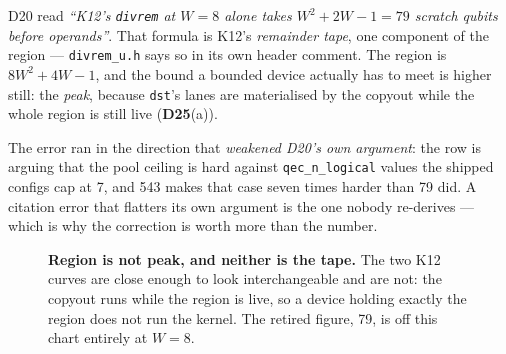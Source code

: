 D20 read \emph{``K12's \texttt{divrem} at $W=8$ alone takes $W^2+2W-1 = 79$
scratch qubits before operands''}. That formula is K12's \emph{remainder tape},
one component of the region --- \texttt{divrem\_u.h} says so in its own header
comment. The region is $8W^2+4W-1$, and the bound a bounded device actually has
to meet is higher still: the \emph{peak}, because \texttt{dst}'s lanes are
materialised by the copyout while the whole region is still live (\textbf{D25}(a)).

\begin{figures}
\end{figures}

\noindent The error ran in the direction that \emph{weakened D20's own
argument}: the row is arguing that the pool ceiling is hard against
\texttt{qec\_n\_logical} values the shipped configs cap at 7, and 543 makes that
case seven times harder than 79 did. A citation error that flatters its own
argument is the one nobody re-derives --- which is why the correction is worth
more than the number.

\begin{figure}[H]
\centering
{}
\caption*{\small\textbf{Region is not peak, and neither is the tape.} The two
K12 curves are close enough to look interchangeable and are not: the copyout
runs while the region is live, so a device holding exactly the region does not
run the kernel. The retired figure, 79, is off this chart entirely at $W=8$.}
\end{figure}

